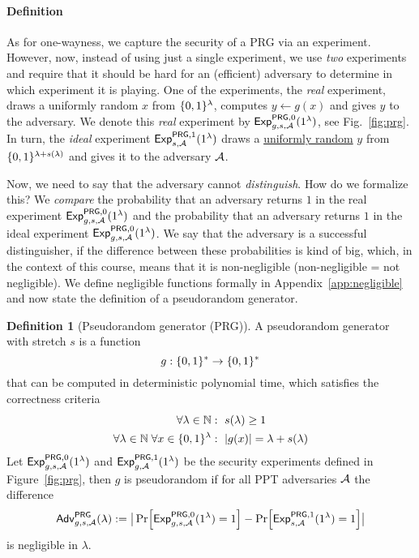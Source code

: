 \documentclass[a4paper,table,dvipsnames]{article}
\theoremstyle{definition}
\newtheorem{definition}{Definition}[section]
\begin{document}
\paragraph{Definition}
As for one-wayness, we capture the security of a PRG via an experiment. However, now, instead of using just a single experiment, we use \emph{two} experiments and require that it should be hard for an (efficient) adversary to determine in which experiment it is playing. One of the experiments, the \emph{real} experiment, draws a uniformly random $x$ from $\{0,1\}^\lambda$, computes $y\gets g(x)$ and gives $y$ to the adversary. We denote this \emph{real} experiment by ${\mathsf{Exp}}_{g,s,\mathcal{A}}^{\mathsf{PRG},0}(1^\lambda)$, see Fig.~\ref{fig:prg}. In turn, the \emph{ideal} experiment ${\mathsf{Exp}}_{s,\mathcal{A}}^{\mathsf{PRG},1}(1^\lambda)$ draws a \underline{uniformly random} $y$ from $\{0,1\}^{\lambda+s(\lambda)}$ and gives it to the adversary $\mathcal{A}$.

\medskip
Now, we need to say that the adversary cannot \emph{distinguish}. How do we formalize this? We \emph{compare} the probability that an adversary returns $1$ in the real experiment ${\mathsf{Exp}}_{g,s,\mathcal{A}}^{\mathsf{PRG},0}(1^\lambda)$ and the probability that an adversary returns $1$ in the ideal experiment ${\mathsf{Exp}}_{g,s,\mathcal{A}}^{\mathsf{PRG},0}(1^\lambda)$. We say that the adversary is a successful distinguisher, if the difference between these probabilities is kind of big, which, in the context of this course, means that it is non-negligible (non-negligible = not negligible). We define negligible functions formally in Appendix~\ref{app:negligible} and now state the definition of a pseudorandom generator.


\begin{definition}[Pseudorandom generator (PRG)]
A pseudorandom generator with stretch $s$ is a function
  \[g:\{0,1\}^*\rightarrow\{0,1\}^*\] 
that can be computed in deterministic polynomial time, which satisfies the correctness criteria
\begin{align*}
\forall \lambda\in\NN&:\ s(\lambda)\geq 1 \\
\forall \lambda\in\NN\; \forall x\in\bin^\lambda&:\ \abs{g(x)}=\lambda+s(\lambda) \\
\end{align*}
Let ${\mathsf{Exp}}_{g,s,\mathcal{A}}^{\mathsf{PRG},0}(1^\lambda)$ and ${\mathsf{Exp}}_{g,\mathcal{A}}^{\mathsf{PRG},1}(1^\lambda)$ be the security experiments defined in Figure~\ref{fig:prg}, then $g$ is pseudorandom if for all PPT adversaries $\mathcal{A}$ the difference
\[ \mathsf{Adv}^{\mathsf{PRG}}_{g,s,\adv}(\lambda):=\big|\prob{{\mathsf{Exp}}_{g,s,\adv}^{\mathsf{PRG},0}(1^\lambda) = 1} 
   - \prob{{\mathsf{Exp}}_{s,\adv}^{\mathsf{PRG},1}(1^\lambda) = 1}\big| \]
is negligible in $\lambda$.
\end{definition}
\end{document}
